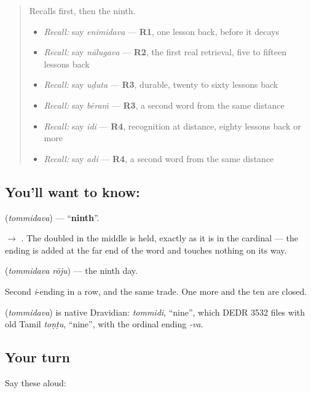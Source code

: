 \label{lesson:TE-C82-ninth}



\begin{quote}
Recalls first, then the ninth.

\begin{itemize}
\raggedright
  \item \emph{Recall:} say \emph{enimidava} — \textbf{R1}, one lesson back, before it decays
  \item \emph{Recall:} say \emph{nālugava} — \textbf{R2}, the first real retrieval, five to fifteen lessons back
  \item \emph{Recall:} say \emph{uḍuta} — \textbf{R3}, durable, twenty to sixty lessons back
  \item \emph{Recall:} say \emph{bēraṁ} — \textbf{R3}, a second word from the same distance
  \item \emph{Recall:} say \emph{idi} — \textbf{R4}, recognition at distance, eighty lessons back or more
  \item \emph{Recall:} say \emph{adi} — \textbf{R4}, a second word from the same distance
\end{itemize}
\end{quote}

\subsection*{You'll want to know: }
\textbf{} (\emph{tommidava}) — \textquotedblleft{}\textbf{ninth}\textquotedblright{}.

\textbf{} $\to$ \textbf{}. The doubled \textbf{} in the middle is held, exactly as it is in the cardinal — the ending is added at the far end of the word and touches nothing on its way.

\textbf{ } (\emph{tommidava rōju}) — the ninth day.

Second \emph{i}-ending in a row, and the same trade. One more and the ten are closed.

\begin{cousinweb}
\textbf{} (\emph{tommidava}) is native Dravidian: \emph{tommidi}, \textquotedblleft{}nine\textquotedblright{}, which DEDR 3532 files with old Tamil \emph{toṇṭu}, \textquotedblleft{}nine\textquotedblright{}, with the ordinal ending \emph{-va}.
\end{cousinweb}

\subsection*{Your turn}
Say these aloud:

